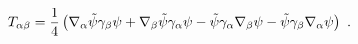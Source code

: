 \begin{equation}\label{2.2}
T_{\alpha\beta}={1 \over 4}
\left(\nabla_\alpha\tilde{\psi}\gamma_\beta\psi+
\nabla_\beta\tilde{\psi}\gamma_\alpha\psi
-\tilde{\psi}\gamma_\alpha \nabla_\beta\psi-
\tilde{\psi}\gamma_\beta \nabla_\alpha\psi
\right)~.
\end{equation}

